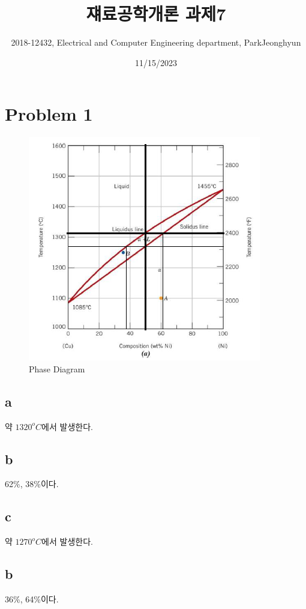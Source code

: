 \documentclass[a4paper]{oblivoir}
\title{쟤료공학개론 과제7}
\author{2018-12432, Electrical and Computer Engineering department, ParkJeonghyun}
\date{11/15/2023}
\begin{document}
\maketitle
\section{Problem 1}
\begin{figure}[htbp]
	\begin{centering}
	\includegraphics[width = 0.75\linewidth]{pro1.png}%
	\caption{\label{fig:pro1}  Phase Diagram}
	\end{centering}
\end{figure}
\subsection{a}
약 $1320^{o}C$에서 발생한다.

\subsection{b}
 62\%,  38\%이다.

\subsection{c}
약 $1270^{o}C$에서 발생한다.

\subsection{b}
 36\%,  64\%이다.
\end{document}
